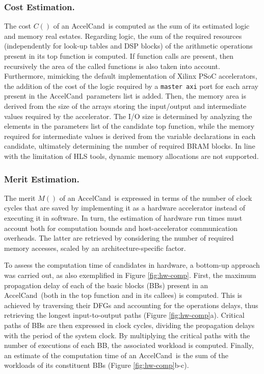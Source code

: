 \documentclass[]{usiinfthesis}
\newcommand{\candidate}{{AccelCand}}
\begin{document}
\subsubsection{Cost Estimation.}
The cost $C()$ of an \candidate\ is computed as the sum of its estimated logic and memory 
real estates. Regarding logic, the sum of the required resources (independently for look-up 
tables and DSP blocks) of the arithmetic operations present in its top function is computed.
If function calls are present, then recursively the area of the called functions is also taken into
account. Furthermore, mimicking the default implementation of Xilinx PSoC accelerators, 
the addition of the cost of the logic required by a \texttt{master axi} port for each array 
present in the \candidate\ parameters list is added.
Then, the memory area is derived from the size of the arrays storing the input/output and intermediate 
values required by the accelerator. The I/O size is determined by analyzing the elements in the 
parameters list of the candidate top function, while the memory required for intermediate values is 
derived from the variable declarations in each candidate, ultimately determining the number of required 
BRAM blocks. In line with the limitation of HLS tools, dynamic memory allocations are not supported.\par

\subsubsection{Merit Estimation.}
The merit $M()$ of an \candidate\ is expressed in terms of the number of clock cycles that are saved by 
implementing it as a hardware accelerator instead of executing it in software. In turn, the estimation 
of hardware run times must account both for computation bounds and host-accelerator communication overheads.  
The latter are retrieved by considering the number of required memory accesses, scaled by an 
architecture-specific factor.\par

To assess the computation time of candidates in hardware, a bottom-up approach was carried out, as also 
exemplified in Figure \ref{fig:hw-comp}. First, the maximum propagation delay of each of the basic blocks 
(BBs) present in an \candidate\ (both in the top function and in its callees) is computed.  This is 
achieved by traversing their DFGs and accounting for the operations delays, thus retrieving the longest 
input-to-output paths (Figure \ref{fig:hw-comp}a).  Critical paths of BBs are then expressed in clock cycles, 
dividing the propagation delays with the period of the system clock. By multiplying the critical paths with 
the number of executions of each BB, the associated workload is computed. Finally, an estimate of the computation time of an \candidate\ is the sum of the workloads of its constituent BBs 
(Figure \ref{fig:hw-comp}b-c).\par
\end{document}
